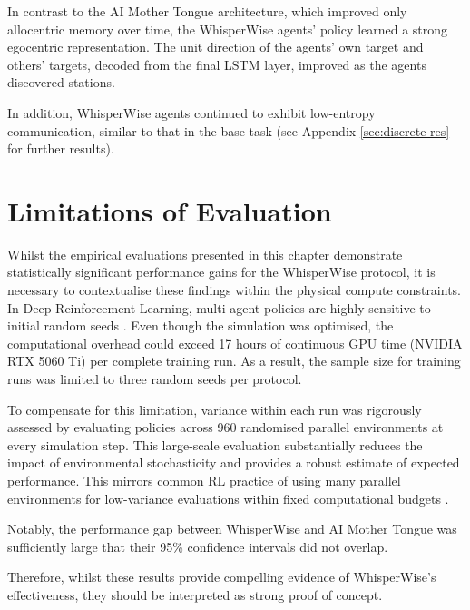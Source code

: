 In contrast to the AI Mother Tongue architecture, which improved only allocentric memory over time, the WhisperWise agents' policy learned a strong egocentric representation.
The unit direction of the agents' own target and others' targets, decoded from the final LSTM layer, improved as the agents discovered stations.

In addition, WhisperWise agents continued to exhibit low-entropy communication, similar to that in the base task (see Appendix \ref{sec:discrete-res} for further results).


\section{Limitations of Evaluation}
\label{sec:4.9}

Whilst the empirical evaluations presented in this chapter demonstrate statistically significant performance gains for the WhisperWise protocol, it is necessary to contextualise these findings within the physical compute constraints.
In Deep Reinforcement Learning, multi-agent policies are highly sensitive to initial random seeds \cite{deep-seeds}.
Even though the simulation was optimised, the computational overhead could exceed 17 hours of continuous GPU time (NVIDIA RTX 5060 Ti) per complete training run.
As a result, the sample size for training runs was limited to three random seeds per protocol.

To compensate for this limitation, variance within each run was rigorously assessed by evaluating policies across 960 randomised parallel environments at every simulation step.
This large-scale evaluation substantially reduces the impact of environmental stochasticity and provides a robust estimate of expected performance.
This mirrors common RL practice of using many parallel environments for low-variance evaluations within fixed computational budgets \cite{MAPPO}.

Notably, the performance gap between WhisperWise and AI Mother Tongue was sufficiently large that their 95\% confidence intervals did not overlap.

Therefore, whilst these results provide compelling evidence of WhisperWise's effectiveness, they should be interpreted as strong proof of concept.



